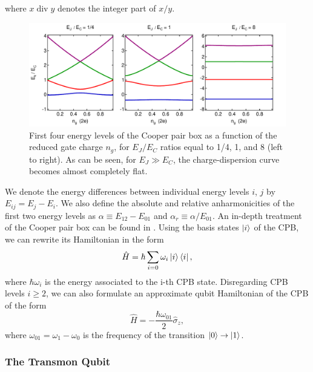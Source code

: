 %
where $x\;\mathrm{div}\;y$ denotes the integer part of $x/y$.
\begin{figure}[ht!]
	\includegraphics[width=\textwidth]{"./material/mathematica/cooper_pair_box_energies"}
	\caption{First four energy levels of the Cooper pair box as a function of the reduced gate charge $n_g$, for $E_J/E_C$ ratios equal to 1/4, 1, and 8 (left to right). As can be seen, for $E_J \gg E_C$, the charge-dispersion curve becomes almost completely flat.}
	\label{fig:CooperPairBoxEnergies}
\end{figure}

We denote the energy differences between individual energy levels $i$, $j$ by $E_{ij} = E_j - E_i$. We also define the absolute and relative anharmonicities of the first two energy levels as $\alpha \equiv E_{12}-E_{01}$ and $\alpha_r \equiv \alpha / E_{01}$. An in-depth treatment of the Cooper pair box can be found in \citep{cottet_implementation_2002}. Using the basis states $\left| i \right>$ of the CPB, we can rewrite its Hamiltonian in the form 
%
\begin{equation}
\hat{H} = \hbar\sum\limits_{i=0} \omega_i\left| i \right>\left< i \right|,
\end{equation}
%
where $\hbar\omega_i$ is the energy associated to the i-th CPB state. Disregarding CPB levels $i \ge 2$, we can also formulate an approximate qubit Hamiltonian of the CPB of the form
%
\begin{equation}
\hat{H} = -\frac{\hbar\omega_{01}}{2}\hat{\sigma}_z, \label{eq:cpb_qubit_hamiltonian}
\end{equation}
%
where $\omega_{01}=\omega_1-\omega_0$ is the frequency of the transition $\left| 0 \right>\to\left| 1 \right>$.

\subsubsection{The Transmon Qubit} \label{section:transmon_qubit}


